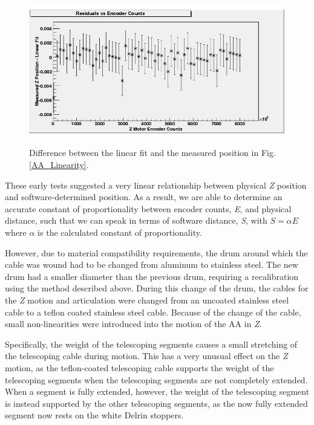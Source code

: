 \begin{figure}
\caption{Difference between the linear fit and the measured position in Fig. \ref{AA_Linearity}.}
\includegraphics[width=\textwidth]{AA/Residuals_Clean.jpg}
\label{AA_Line_Residuals}
\end{figure}

These early tests suggested a very linear relationship between physical \emph{Z} position and software-determined position. As a result, we are able to determine an accurate constant of proportionality between encoder counts, \emph{E}, and physical distance, such that we can speak in terms of software distance, \emph{S}, with $S= \alpha E$ where $\alpha$ is the calculated constant of proportionality. 

However, due to material compatibility requirements, the drum around which the cable was wound had to be changed from aluminum to stainless steel. The new drum had a smaller diameter than the previous drum, requiring a recalibration using the method described above.  During this change of the drum, the cables for the \emph{Z} motion and articulation were changed from an uncoated stainless steel cable to a teflon coated stainless steel cable. Because of the change of the cable, small non-linearities were introduced into the motion of the AA in \emph{Z}. 

Specifically, the weight of the telescoping segments causes a small stretching of the telescoping cable during motion. This has a very unusual effect on the \emph{Z} motion, as the teflon-coated telescoping cable supports the weight of the telescoping segments when the telescoping segments are not completely extended. When a segment is fully extended, however, the weight of the telescoping segment is instead supported by the other telescoping segments, as the now fully extended segment now rests on the white Delrin stoppers. 

